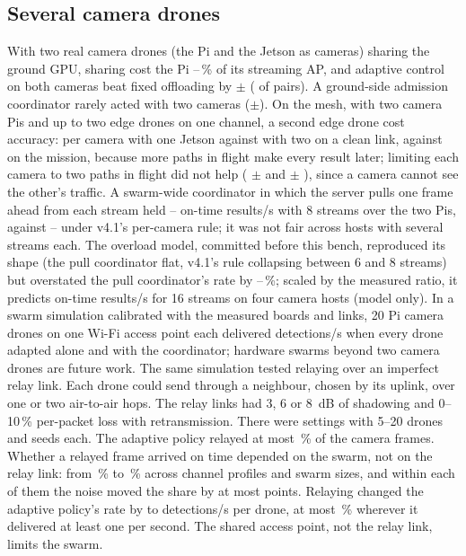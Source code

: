 \documentclass[conference]{IEEEtran}
\begin{document}
\subsection{Several camera drones}\label{sec:swarm}
With two real camera drones (the Pi and the Jetson as cameras) sharing the ground GPU, sharing cost the Pi
\DuoShareLossMin--\DuoShareLossMax\,\% of its streaming AP, and adaptive control on both cameras beat fixed offloading
by \DuoAdaptGain{}$\pm$\DuoAdaptCi{} (\DuoAdaptWins{} of \DuoPairs{} pairs). A ground-side admission coordinator
rarely acted with two cameras (\DuoCoordGain{}$\pm$\DuoCoordCi{}). On the mesh, with two camera Pis and up to two
edge drones on one channel, a second edge drone cost accuracy: per camera \BdTwoOneStat{} with one Jetson against
\BdTwoTwoStat{} with two on a clean link, \BdTwoOneMis{} against \BdTwoTwoMis{} on the mission, because more paths in
flight make every result later; limiting each camera to two paths in flight did not help (\BdCapStat{} $\pm$
\BdCapStatCi{} and \BdCapMis{} $\pm$ \BdCapMisCi), since a camera cannot see the other's traffic. A swarm-wide
coordinator in which the server pulls one frame ahead from each stream held \BdPullEightMin--\BdPullEightMax{} on-time
results/s with 8 streams over the two Pis, against \BdRuleEightMin--\BdRuleEightMax{} under v4.1's per-camera rule; it
was not fair across hosts with several streams each. The overload model, committed before this bench, reproduced its
shape (the pull coordinator flat, v4.1's rule collapsing between 6 and 8 streams) but overstated the pull coordinator's
rate by \PmErrMin--\PmErrMax\,\%; scaled by the measured ratio, it predicts \PmExtrap{} on-time results/s for 16 streams
on four camera hosts (model only). In a swarm simulation calibrated with the measured
boards and links, 20 Pi camera drones on one Wi-Fi access point each delivered \SwarmTwentyAlone{} detections/s when
every drone adapted alone and \SwarmTwentyCoord{} with the coordinator; hardware swarms beyond two camera drones are future work.
The same simulation tested relaying over an imperfect relay link. Each drone could send through a neighbour, chosen by
its uplink, over one or two air-to-air hops. The relay links had 3, 6 or 8~dB of shadowing and 0--10\,\% per-packet loss
with retransmission. There were \RnSettings{} settings with 5--20 drones and \RnSeeds{} seeds each. The adaptive policy
relayed at most \RnRelayedPct\,\% of the camera frames. Whether a relayed frame arrived on time depended on the swarm,
not on the relay link: from \RnCondShareMin\,\% to \RnCondShareMax\,\% across channel profiles and swarm sizes, and
within each of them the noise moved the share by at most \RnNoiseSpreadPts{} points. Relaying changed the adaptive
policy's rate by \RnGainMin{} to \RnGainMax{} detections/s per drone, at most \RnGainRelPct\,\% wherever it delivered
at least one per second. The shared access point, not the relay link, limits the swarm.
\end{document}
